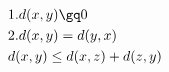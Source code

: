 \documentclass[preview]{standalone}
\begin{document}
\begin{align*}
& 1. d(x,y) \gq 0 \\& 2. d(x,y)=d(y,x) \\& d(x,y) \leq d(x,z) + d(z,y) \\&
\end{align*}
\end{document}
